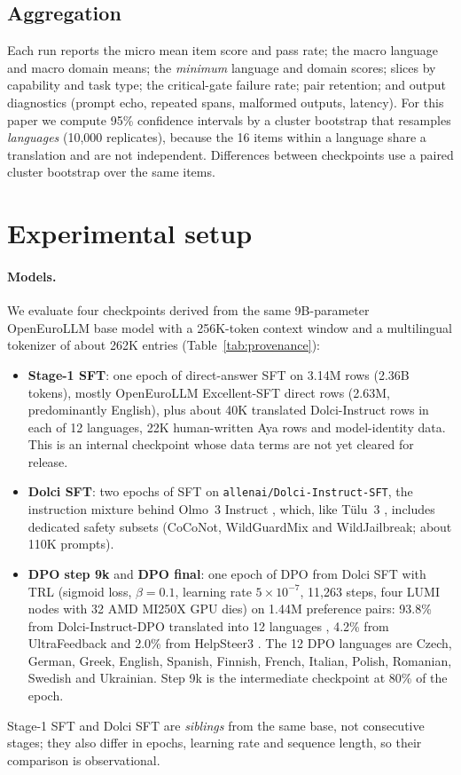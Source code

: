 \documentclass[11pt]{article}
\begin{document}
\subsection{Aggregation}
Each run reports the micro mean item score and pass rate; the macro language and macro domain means; the \emph{minimum} language and domain scores; slices by capability and task type; the critical-gate failure rate; pair retention; and output diagnostics (prompt echo, repeated spans, malformed outputs, latency). For this paper we compute 95\% confidence intervals by a cluster bootstrap that resamples \emph{languages} (10{,}000 replicates), because the 16 items within a language share a translation and are not independent. Differences between checkpoints use a paired cluster bootstrap over the same items.

\section{Experimental setup}
\label{sec:setup}

\paragraph{Models.} We evaluate four checkpoints derived from the same 9B-parameter OpenEuroLLM base model with a 256K-token context window and a multilingual tokenizer of about 262K entries (Table~\ref{tab:provenance}):
\begin{itemize}
\item \textbf{Stage-1 SFT}: one epoch of direct-answer SFT on 3.14M rows (2.36B tokens), mostly OpenEuroLLM Excellent-SFT direct rows (2.63M, predominantly English), plus about 40K translated Dolci-Instruct rows in each of 12 languages, 22K human-written Aya rows and model-identity data. This is an internal checkpoint whose data terms are not yet cleared for release.
\item \textbf{Dolci SFT}: two epochs of SFT on \texttt{allenai/Dolci-Instruct-SFT}, the instruction mixture behind Olmo~3 Instruct \citep{olmo2025olmo3}, which, like Tülu~3 \citep{lambert2024tulu3}, includes dedicated safety subsets (CoCoNot, WildGuardMix and WildJailbreak; about 110K prompts).
\item \textbf{DPO step 9k} and \textbf{DPO final}: one epoch of DPO \citep{rafailov2023dpo} from Dolci SFT with TRL \citep{vonwerra2020trl} (sigmoid loss, $\beta=0.1$, learning rate $5\times10^{-7}$, 11{,}263 steps, four LUMI nodes with 32 AMD MI250X GPU dies) on 1.44M preference pairs: 93.8\% from Dolci-Instruct-DPO translated into 12 languages \citep{dolcitranslated}, 4.2\% from UltraFeedback \citep{cui2024ultrafeedback} and 2.0\% from HelpSteer3 \citep{wang2025helpsteer3}. The 12 DPO languages are Czech, German, Greek, English, Spanish, Finnish, French, Italian, Polish, Romanian, Swedish and Ukrainian. Step 9k is the intermediate checkpoint at 80\% of the epoch.
\end{itemize}
Stage-1 SFT and Dolci SFT are \emph{siblings} from the same base, not consecutive stages; they also differ in epochs, learning rate and sequence length, so their comparison is observational.
\end{document}
